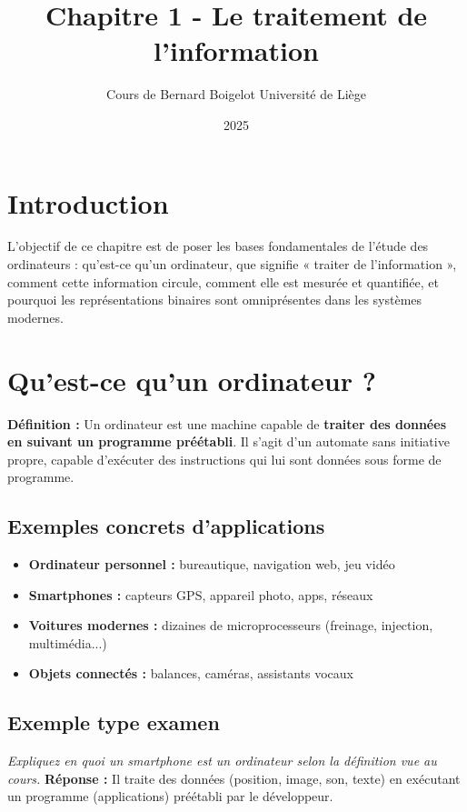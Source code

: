 \documentclass[12pt,a4paper]{article}
\title{\Huge\textbf{Chapitre 1 - Le traitement de l'information}}
\author{Cours de Bernard Boigelot \newline Université de Liège}
\date{2025}
\begin{document}
\maketitle

\tableofcontents

\newpage

\section{Introduction}

L’objectif de ce chapitre est de poser les bases fondamentales de l’étude des ordinateurs : qu’est-ce qu’un ordinateur, que signifie « traiter de l’information », comment cette information circule, comment elle est mesurée et quantifiée, et pourquoi les représentations binaires sont omniprésentes dans les systèmes modernes.

\section{Qu’est-ce qu’un ordinateur ?}

\textbf{Définition :} Un ordinateur est une machine capable de \textbf{traiter des données en suivant un programme préétabli}. Il s’agit d’un automate sans initiative propre, capable d’exécuter des instructions qui lui sont données sous forme de programme.

\subsection{Exemples concrets d'applications}
\begin{itemize}
  \item \textbf{Ordinateur personnel :} bureautique, navigation web, jeu vidéo
  \item \textbf{Smartphones :} capteurs GPS, appareil photo, apps, réseaux
  \item \textbf{Voitures modernes :} dizaines de microprocesseurs (freinage, injection, multimédia...)
  \item \textbf{Objets connectés :} balances, caméras, assistants vocaux
\end{itemize}

\subsection{Exemple type examen}
\textit{Expliquez en quoi un smartphone est un ordinateur selon la définition vue au cours.}
\newline\textbf{Réponse :} Il traite des données (position, image, son, texte) en exécutant un programme (applications) préétabli par le développeur.
\end{document}
